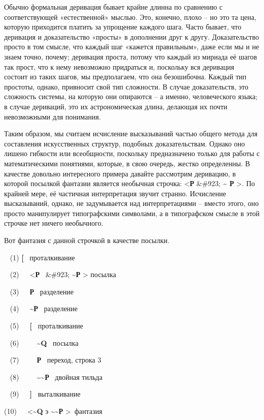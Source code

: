 \documentclass[../main.tex]{subfiles}
\begin{document}
Обычно формальная деривация бывает крайне длинна по сравнению с соответствующей «естественной» мыслью. Это, конечно, плохо \--- но это та цена, которую приходится платить за упрощение каждого шага. Часто бывает, что деривация и доказательство «просты» в дополнении друг к другу. Доказательство просто в том смысле, что каждый шаг «кажется правильным», даже если мы и не знаем точно, почему; деривация проста, потому что каждый из мириада её шагов так прост, что к нему невозможно придраться и, поскольку вся деривация состоит из таких шагов, мы предполагаем, что она безошибочна. Каждый тип простоты, однако, привносит свой тип сложности. В случае доказательств, это сложность системы, на которую они опираются \--- а именно, человеческого языка; в случае дериваций, это их астрономическая длина, делающая их почти невозможными для понимания.

Таким образом, мы считаем исчисление высказываний частью общего метода для составления искусственных структур, подобных доказательствам. Однако оно лишено гибкости или всеобщности, поскольку предназначено только для работы с математическими понятиями, которые, в свою очередь, жестко определенны. В качестве довольно интересного примера давайте рассмотрим деривацию, в которой посылкой фантазии является необычная строчка: \textless{}\textbf{Р} \&\#923; \textbf{\textasciitilde{} Р} \textgreater. По крайней мере, её частичная интерпретация звучит странно. Исчисление высказываний, однако, не задумывается над интерпретациями \--- вместо этого, оно просто манипулирует типографскими символами, а в типографском смысле в этой строчке нет ничего необычного.

Вот фантазия с данной строчкой в качестве посылки.

~ (1) \textbf{{[}} ~проталкивание

~ (2)~~~\textless{}\textbf{Р} ~\&\#923; \textbf{\textasciitilde Р} \textgreater{} посылка

~ (3)~~~\textbf{Р} ~разделение

~ (4)~~~\textbf{\textasciitilde Р} ~разделение

~ (5)~~~\textbf{{[}} ~проталкивание

~ (6)~~~~~\textbf{\textasciitilde Q} ~посылка

~ (7)~~~~~\textbf{Р} ~переход, строка 3

~ (8)~~~~~\textbf{\textasciitilde\textasciitilde Р} ~двойная тильда

~ (9)~~~\textbf{{]}} ~выталкивание

(10)~~~\textless{}\textbf{\textasciitilde Q} э \textbf{\textasciitilde\textasciitilde Р} \textgreater~фантазия
\end{document}
